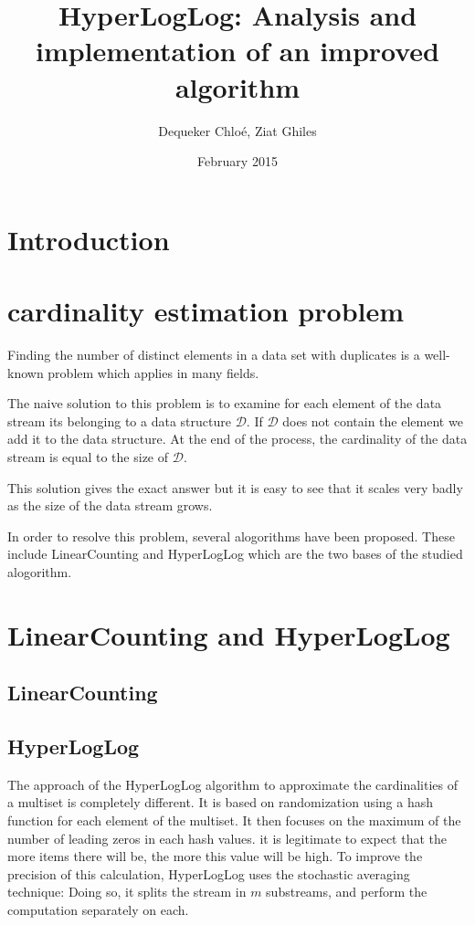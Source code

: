 \documentclass{article}
\title{HyperLogLog: Analysis and implementation of an improved algorithm}
\author{Dequeker Chloé, Ziat Ghiles}
\date{February 2015}
\begin{document}
\maketitle
\clearpage

\tableofcontents
\clearpage

\section{Introduction}

\section{cardinality estimation problem}
Finding the number of distinct elements in a data set with duplicates
is a well-known problem which applies in many fields.

The naive solution to this problem is to examine for each element of
the data stream its belonging to a data structure $\mathcal{D}$. If
$\mathcal{D}$ does not contain the element we add it to the data
structure. At the end of the process, the cardinality of the data
stream is equal to the size of $\mathcal{D}$.

This solution gives the exact answer but it is easy to see that it
scales very badly as the size of the data stream grows.

In order to resolve this problem, several alogorithms have been
proposed. These include LinearCounting and HyperLogLog which are the two
bases of the studied alogorithm.
\section{LinearCounting and HyperLogLog}
\subsection{LinearCounting}
\subsection{HyperLogLog}
The approach of the HyperLogLog algorithm to approximate the
cardinalities of a multiset is completely different. It is based on
randomization using a hash function for each element of the
multiset. It then focuses on the maximum of the number of leading
zeros in each hash values. it is legitimate to expect that the more
items there will be, the more this value will be high.
To improve the precision of this calculation, HyperLogLog uses the
stochastic averaging technique: Doing so, it splits the stream in
$m$ substreams, and perform the computation separately on each.
\end{document}
